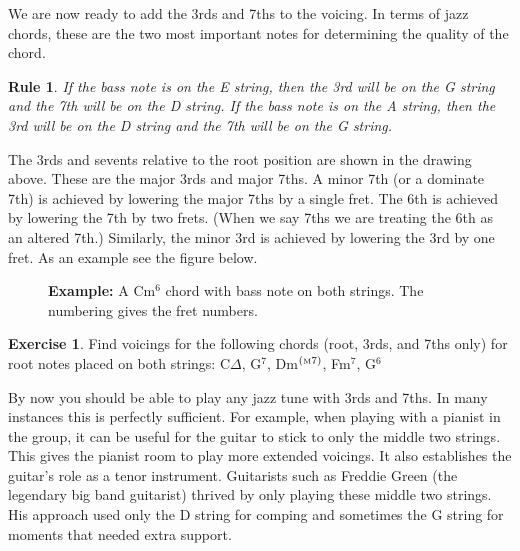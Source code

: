 \documentclass[12pt]{article}
\newtheorem{nrule}{Rule}
\theoremstyle{definition}
\newtheorem{exercise}{Exercise}
\begin{document}
We are now ready to add the 3rds and 7ths to the voicing. In terms of jazz chords, these are the two most important notes for determining the quality of the chord. 

\begin{nrule}
If the bass note is on the E string, then the 3rd will be on the G string and the 7th will be on the D string. If the bass note is on the A string, then the 3rd will be on the D string and the 7th will be on the G string. 
\end{nrule}

\noindent
\begin{minipage}{0.5\textwidth}
\end{minipage}
\begin{minipage}{0.5\textwidth}
\end{minipage}

The 3rds and sevents relative to the root position are shown in the drawing above. 
These are the major 3rds and major 7ths. A minor 7th (or a dominate 7th) is achieved by lowering the major 7ths by a single fret. The 6th is achieved by lowering the 7th by two frets. (When we say 7ths we are treating the 6th as an altered 7th.) Similarly, the minor 3rd is achieved by lowering the 3rd by one fret. As an example see the figure below. 

\begin{figure}[H]
\noindent
\textbf{Example:} A Cm$^6$ chord with bass note on both strings. The numbering gives the fret numbers. 

\noindent
\begin{minipage}{0.5\textwidth}
\end{minipage}
\begin{minipage}{0.5\textwidth}
\end{minipage}
\end{figure}


\begin{exercise}
Find voicings for the following chords (root, 3rds, and 7ths only) for root notes placed on both strings: C$\Delta$, G$^7$, Dm$^{(\textrm {\tiny M} 7)}$, Fm$^7$, G$^6$
\end{exercise}

By now you should be able to play any jazz tune with 3rds and 7ths. In many instances this is perfectly sufficient. For example, when playing with a pianist in the group, it can be useful for the guitar to stick to only the middle two strings. 
This gives the pianist room to play more extended voicings. It also establishes the guitar's role as a tenor instrument. 
Guitarists such as Freddie Green (the legendary big band guitarist) thrived by only playing these middle two strings. His approach used only the D string for comping and sometimes the G string for moments that needed extra support. 
\end{document}
